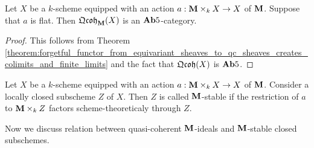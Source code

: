 \begin{corollary}\label{corollary:for_flat_actions_equivariant_qc_sheaves_are_Ab5}
Let $X$ be a $k$-scheme equipped with an action $a:\mathbf{M}\times_kX\rightarrow X$ of $\mathbf{M}$. Suppose that $a$ is flat. Then $\mathfrak{Qcoh}_{\mathbf{M}}(X)$ is an $\mathbf{Ab}5$-category.
\end{corollary}
\begin{proof}
This follows from Theorem \ref{theorem:forgetful_functor_from_equivariant_sheaves_to_qc_sheaves_creates_colimits_and_finite_limits} and the fact that $\mathfrak{Qcoh}(X)$ is $\mathbf{Ab}5$.
\end{proof}

\begin{definition}
Let $X$ be a $k$-scheme equipped with an action $a:\mathbf{M}\times_kX\rightarrow X$ of $\mathbf{M}$. Consider a locally closed subscheme $Z$ of $X$. Then $Z$ is called $\mathbf{M}$-stable if the restriction of $a$ to $\mathbf{M}\times_kZ$ factors scheme-theoreticaly through $Z$.
\end{definition}
\noindent
Now we discuss relation between quasi-coherent $\mathbf{M}$-ideals and $\mathbf{M}$-stable closed subschemes.


